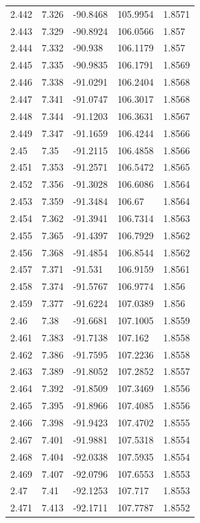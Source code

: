 \begin{tabular}{lllll}
2.442 & 7.326 & -90.8468 & 105.9954 & 1.8571 \\
2.443 & 7.329 & -90.8924 & 106.0566 & 1.857 \\
2.444 & 7.332 & -90.938 & 106.1179 & 1.857 \\
2.445 & 7.335 & -90.9835 & 106.1791 & 1.8569 \\
2.446 & 7.338 & -91.0291 & 106.2404 & 1.8568 \\
2.447 & 7.341 & -91.0747 & 106.3017 & 1.8568 \\
2.448 & 7.344 & -91.1203 & 106.3631 & 1.8567 \\
2.449 & 7.347 & -91.1659 & 106.4244 & 1.8566 \\
2.45 & 7.35 & -91.2115 & 106.4858 & 1.8566 \\
2.451 & 7.353 & -91.2571 & 106.5472 & 1.8565 \\
2.452 & 7.356 & -91.3028 & 106.6086 & 1.8564 \\
2.453 & 7.359 & -91.3484 & 106.67 & 1.8564 \\
2.454 & 7.362 & -91.3941 & 106.7314 & 1.8563 \\
2.455 & 7.365 & -91.4397 & 106.7929 & 1.8562 \\
2.456 & 7.368 & -91.4854 & 106.8544 & 1.8562 \\
2.457 & 7.371 & -91.531 & 106.9159 & 1.8561 \\
2.458 & 7.374 & -91.5767 & 106.9774 & 1.856 \\
2.459 & 7.377 & -91.6224 & 107.0389 & 1.856 \\
2.46 & 7.38 & -91.6681 & 107.1005 & 1.8559 \\
2.461 & 7.383 & -91.7138 & 107.162 & 1.8558 \\
2.462 & 7.386 & -91.7595 & 107.2236 & 1.8558 \\
2.463 & 7.389 & -91.8052 & 107.2852 & 1.8557 \\
2.464 & 7.392 & -91.8509 & 107.3469 & 1.8556 \\
2.465 & 7.395 & -91.8966 & 107.4085 & 1.8556 \\
2.466 & 7.398 & -91.9423 & 107.4702 & 1.8555 \\
2.467 & 7.401 & -91.9881 & 107.5318 & 1.8554 \\
2.468 & 7.404 & -92.0338 & 107.5935 & 1.8554 \\
2.469 & 7.407 & -92.0796 & 107.6553 & 1.8553 \\
2.47 & 7.41 & -92.1253 & 107.717 & 1.8553 \\
2.471 & 7.413 & -92.1711 & 107.7787 & 1.8552 \\

\end{tabular}
